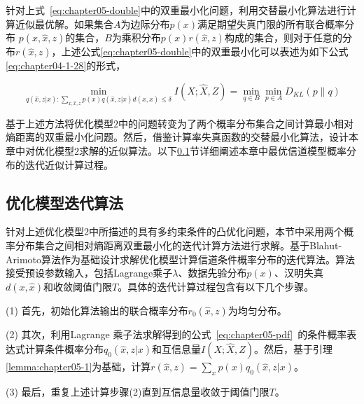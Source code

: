针对上式~\ref{eq:chapter05-double}中的双重最小化问题，利用交替最小化算法进行计算近似最优解。如果集合$A$为边际分布$p(x)$满足期望失真门限的所有联合概率分布 $p(x,\hat{x},z)$的集合，$B$为乘积分布$p(x)r(\hat{x},z)$构成的集合，则对于任意的分布$r(\hat{x},z)$，上述公式\ref{eq:chapter05-double}中的双重最小化可以表述为如下公式\ref{eq:chapter04-1-28}的形式，

\begin{equation}\label{eq:chapter04-1-28}
	\min_{q(\hat{x},z|x):\sum_{x,\hat{x},z}p(x)q(\hat{x},z|x)d(x,\hat{x})\leq  \delta } I(X;\hat{X},Z)=\min_{q \in B}\min_{p \in A} D_{KL}(p\parallel q)
\end{equation}

基于上述方法将优化模型$2$中的问题转变为了两个概率分布集合之间计算最小相对熵距离的双重最小化问题。然后，借鉴计算率失真函数的交替最小化算法\cite{csiszar1984information,csiszar1974on}，设计本章中对优化模型$2$求解的近似算法。以下\ref{sec:chapter04-algorithm}节详细阐述本章中最优信道模型概率分布的迭代近似计算过程。

\subsection{优化模型迭代算法}\label{sec:chapter04-algorithm}

针对上述优化模型2中所描述的具有多约束条件的凸优化问题，本节中采用两个概率分布集合之间相对熵距离双重最小化的迭代计算方法进行求解。基于Blahut-Arimoto算法作为基础设计求解优化模型计算信道条件概率分布的迭代算法。算法接受预设参数输入，包括Lagrange乘子$\lambda$、数据先验分布$p(x)$、汉明失真$d(x,\hat{x})$和收敛阈值门限$T$。具体的迭代计算过程包含有以下几个步骤。

(1) 首先，初始化算法输出的联合概率分布$r_0(\hat{x},z)$为均匀分布。

(2) 其次，利用Lagrange 乘子法求解得到的公式~\ref{eq:chapter05-pdf}~的条件概率表达式计算条件概率分布$q_0(\hat{x},z|x)$和互信息量$I(X;\hat{X},Z)$。然后，基于引理\ref{lemma:chapter05-1}为基础，计算$r(\hat{x},z)=\sum_{x}p(x)q_0(\hat{x},z|x)$。

(3) 最后，重复上述计算步骤(2)直到互信息量收敛于阈值门限$T$。

